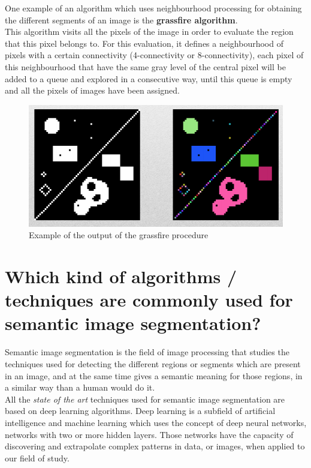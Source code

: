 \documentclass{article}
\begin{document}
One example of an algorithm which uses neighbourhood processing for obtaining the different segments of an image is the \textbf{grassfire algorithm}. \\

This algorithm visits all the pixels of the image in order to evaluate the region that this pixel belongs to. For this evaluation, it defines a neighbourhood of pixels with a certain connectivity (4-connectivity or 8-connectivity), each pixel of this neighbourhood that have the same gray level of the central pixel will be added to a queue and explored in a consecutive way, until this queue is empty and all the pixels of images have been assigned.

\begin{figure}[H]
    \centering
    \includegraphics[scale=0.35]{report/exam/images/grassfire.png}
    \caption{Example of the output of the grassfire procedure}
    \label{fig:my_label}
\end{figure}

\section{Which kind of algorithms / techniques are commonly used for semantic image segmentation?}

Semantic image segmentation is the field of image processing that studies the techniques used for detecting the different regions or segments which are present in an image, and at the same time gives a semantic meaning for those regions, in a similar way than a human would do it.\\

All the \textit{state of the art} techniques used for semantic image segmentation are based on deep learning algorithms. Deep learning is a subfield of artificial intelligence and machine learning which uses the concept of deep neural networks, networks with two or more hidden layers. Those networks have the capacity of discovering and extrapolate complex patterns in data, or images, when applied to our field of study. \\
\end{document}
